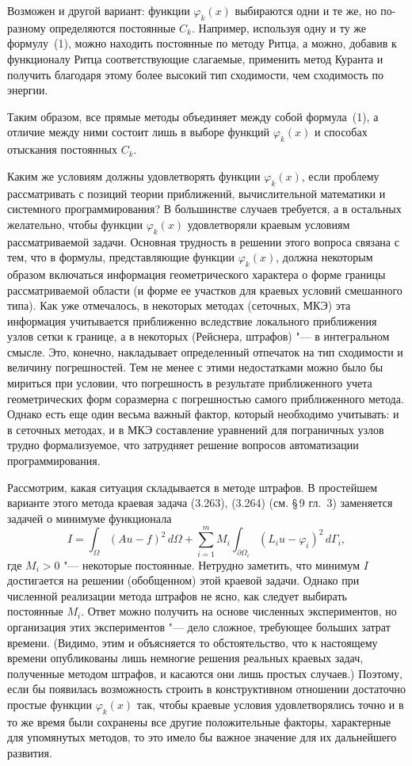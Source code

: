 Возможен и другой вариант: функции $\varphi_k(x)$ выбираются одни и те же,
но по-разному определяются постоянные $C_k$. Например, используя одну и ту
же формулу~(1), можно находить постоянные по методу Ритца, а можно, добавив
к функционалу Ритца соответствующие слагаемые, применить метод Куранта
и получить благодаря этому более высокий тип сходимости, чем сходимость по
энергии.

Таким образом, все прямые методы объединяет между собой формула~(1),
а отличие между ними состоит лишь в выборе функций $\varphi_k(x)$
и способах отыскания постоянных $C_k$.
%

Каким же условиям должны удовлетворять функции $\varphi_k(x)$, если
проблему рассматривать с позиций теории приближений, вычислительной
математики и системного программирования? В большинстве случаев требуется,
а в остальных желательно, чтобы функции $\varphi_k(x)$ удовлетворяли краевым
условиям рассматриваемой задачи. Основная трудность в решении этого вопроса
связана с тем, что в формулы, представляющие функции $\varphi_k(x)$, должна
некоторым образом включаться информация геометрического характера о форме
границы рассматриваемой области (и форме ее участков для краевых условий
смешанного типа). Как уже отмечалось, в некоторых методах (сеточных, МКЭ)
эта информация учитывается приближенно вследствие локального приближения
узлов сетки к границе, а в некоторых (Рейснера, штрафов) "--- в интегральном
смысле. Это, конечно, накладывает определенный отпечаток на тип сходимости
и величину погрешностей. Тем не менее с этими недостатками можно было бы
мириться при условии, что погрешность в результате приближенного учета
геометрических форм соразмерна с погрешностью самого приближенного метода.
Однако есть еще один весьма важный фактор, который необходимо учитывать:
и в сеточных методах, и в МКЭ составление уравнений для пограничных узлов
трудно формализуемое, что затрудняет решение вопросов автоматизации
программирования.

Рассмотрим, какая ситуация складывается в методе штрафов. В простейшем
варианте этого метода краевая задача (3.263), (3.264) (см. \S\,9 гл.~3)
заменяется задачей о минимуме функционала
\begin{equation}\tag{3}
I=\int_\Omega(Au-f)^2\,d\Omega+\sum_{i=1}^{m}M_i\int_{\partial\Omega_i}(L_iu-\varphi_i)^2\,d\Gamma_i,
\end{equation}
где $M_i>0$ "--- некоторые постоянные. Нетрудно заметить, что минимум $I$
достигается на решении (обобщенном) этой краевой задачи. Однако при
численной реализации метода штрафов не ясно, как следует выбирать
постоянные $M_i$. Ответ можно получить на основе численных экспериментов,
но организация этих экспериментов "--- дело сложное, требующее больших
затрат времени. (Видимо, этим и объясняется то обстоятельство, что
к настоящему времени опубликованы лишь немногие решения реальных краевых
задач, полученные методом штрафов, и касаются они лишь простых случаев.)
Поэтому, если бы появилась возможность строить в конструктивном отношении
достаточно простые функции $\varphi_k(x)$ так, чтобы краевые условия
удовлетворялись точно и в то же время были сохранены все другие
положительные факторы, характерные для упомянутых методов, то это имело бы
важное значение для их дальнейшего развития.

